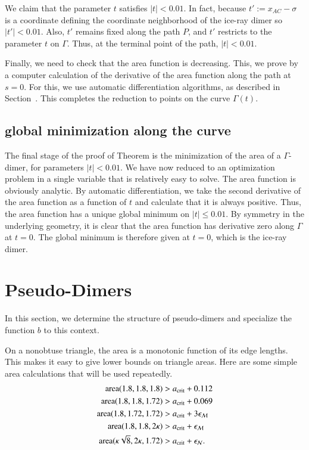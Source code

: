 We claim that the parameter $t$ satisfies $|t|<0.01$.  In fact,
because $t' := x_{AC}-\sigma$ is a coordinate defining the coordinate
neighborhood of the ice-ray dimer so $|t'|<0.01$.  Also, $t'$ remains
fixed along the path $P$, and $t'$ restricts to the parameter $t$ on
$\Gamma$.  Thus, at the terminal point of the path, $|t|<0.01$.

Finally, we need to check that the area function is decreasing. This,
we prove by a computer calculation of the derivative of the area
function along the path at $s=0$.  For this, we use automatic
differentiation algorithms, as described in
Section~.  This completes the reduction to points
on the curve $\Gamma(t)$.

\subsection{global minimization along the curve}

The final stage of the proof of Theorem  is the
minimization of the area of a $\Gamma$-dimer, for parameters
$|t|<0.01$.  We have now reduced to an optimization problem in a
single variable that is relatively easy to solve.  The area function
is obviously analytic.  By automatic differentiation, we take the
second derivative of the area function as a function of $t$ and
calculate that it is always positive.  Thus, the area function has a
unique global minimum on $|t|\le 0.01$.  By symmetry in the underlying
geometry, it is clear that the area function has derivative zero along
$\Gamma$ at $t=0$.  The global minimum is therefore given at $t=0$,
which is the ice-ray dimer.

\section{Pseudo-Dimers}

In this section, we determine the structure of pseudo-dimers and
specialize the function $b$ to this context.

On a nonobtuse triangle, the area is a monotonic function of its edge
lengths.  This makes it easy to give lower bounds on triangle areas.
Here are some simple area calculations that will be used repeatedly.
\begin{align*}
{\operatorname{area}}(1.8,1.8,1.8) &> a_\text{crit} + 0.112\\
{\operatorname{area}}(1.8,1.8,1.72) &> a_\text{crit} + 0.069\\
{\operatorname{area}}(1.8,1.72,1.72) &> a_\text{crit} + 3\epsilon_{\mathcal M}\\
{\operatorname{area}}(1.8,1.8,2\kappa) &> a_\text{crit} + \epsilon_{\mathcal M}\\
{\operatorname{area}}(\kappa\sqrt8,2\kappa,1.72) &> a_\text{crit} +\epsilon_{\mathcal N}.
\end{align*}


